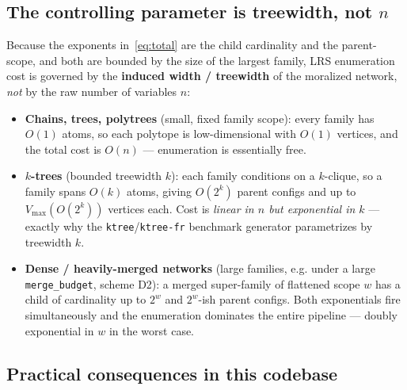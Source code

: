 \documentclass[11pt]{article}
\begin{document}
\subsection{The controlling parameter is treewidth, not $n$}

Because the exponents in~\eqref{eq:total} are the child cardinality and the parent-scope,
and both are bounded by the size of the largest family, LRS enumeration cost is governed
by the \textbf{induced width / treewidth} of the moralized network, \emph{not} by the raw
number of variables $n$:
\begin{itemize}
  \item \textbf{Chains, trees, polytrees} (small, fixed family scope): every family has
    $O(1)$ atoms, so each polytope is low-dimensional with $O(1)$ vertices, and the total
    cost is $O(n)$ --- enumeration is essentially free.
  \item \textbf{$k$-trees} (bounded treewidth $k$): each family conditions on a $k$-clique,
    so a family spans $O(k)$ atoms, giving $O(2^{k})$ parent configs and up to
    $V_{\max}(O(2^{k}))$ vertices each. Cost is \emph{linear in $n$ but exponential in
    $k$} --- exactly why the \texttt{ktree}/\texttt{ktree-fr} benchmark generator
    parametrizes by treewidth $k$.
  \item \textbf{Dense / heavily-merged networks} (large families, e.g. under a large
    \texttt{merge\_budget}, scheme D2): a merged super-family of flattened scope $w$ has a
    child of cardinality up to $2^{w}$ and $2^{w}$-ish parent configs. Both exponentials
    fire simultaneously and the enumeration dominates the entire pipeline --- doubly
    exponential in $w$ in the worst case.
\end{itemize}

\subsection{Practical consequences in this codebase}
\end{document}
